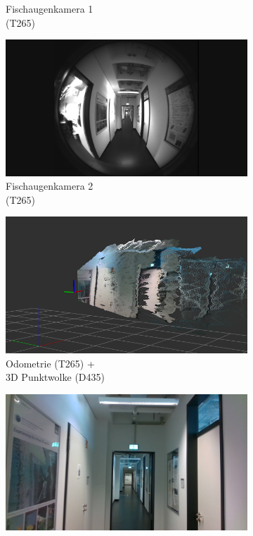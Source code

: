 \begin{figure}[H]
\begin{subfigure}[t]{0.3\linewidth}
		\caption{Fischaugenkamera 1 \\ (T265)}
		\label{subfig:fisheye1}
	\end{subfigure}
	\hfill
	\begin{subfigure}[t]{0.3\linewidth}
		\centering
		\includegraphics[width=\linewidth]{images/real_dataset/f2_frame000005.png}
		\caption{Fischaugenkamera 2 \\ (T265)}
		\label{subfig:fisheye2}
	\end{subfigure}
	\hfill \medskip
	\begin{subfigure}[t]{0.3\linewidth}
		\centering
		\includegraphics[width=\linewidth]{images/real_dataset/pointcloud1.png}
		\caption{Odometrie  (T265) + \\ 3D Punktwolke (D435)}
		\label{subfig:odom2}
	\end{subfigure}
	\hfill
	\begin{subfigure}[t]{0.3\linewidth}
		\centering
		\includegraphics[width=\linewidth]{images/real_dataset/dc_frame000005.png}

\end{subfigure}
\end{figure}
